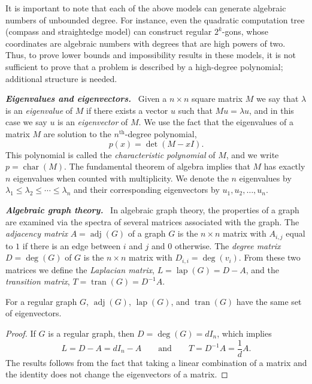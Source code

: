 \documentclass[oribibl,10pt]{llncs}
\newcommand{\Emph}[1]{\smallskip\textbf{\textit{#1}}~}
\DeclareMathOperator{\adjacency}{adj}
\DeclareMathOperator{\degree}{deg}
\DeclareMathOperator{\laplacian}{lap}
\DeclareMathOperator{\transition}{tran}
\DeclareMathOperator{\characteristic}{char}
\newcommand{\nth}[1]{$#1^\text{th}$}
\begin{document}
It is important to note that each of
the above models can generate algebraic numbers of unbounded degree. 
For instance, even the quadratic computation tree 
(compass and straightedge model) can construct regular $2^k$-gons, whose coordinates are
algebraic numbers with degrees that are high powers of two.
Thus, to prove lower bounds and impossibility results in these models, 
it is not sufficient to prove that a problem is described by a high-degree polynomial; additional structure is needed.

\ifFull
\Emph{Eigenvalues and eigenvectors.}
Given a $n\times n$ square matrix $M$ we say that $\lambda$ is an \emph{eigenvalue} of $M$ if there exists a vector $u$ such that $Mu = \lambda u$, and in this case we say $u$ is an \emph{eigenvector} of $M$. We use the fact that the eigenvalues of a matrix $M$ are solution to the \nth{n}-degree polynomial,
\[
p(x) = \det(M - xI).
\]
This polynomial is called the \emph{characteristic polynomial} of $M$,
and we write $p = \characteristic(M)$. The fundamental theorem of algebra implies that $M$ has exactly $n$ eigenvalues when counted with multiplicity. We denote the $n$ eigenvalues by $\lambda_1 \leq \lambda_2 \leq \cdots \leq \lambda_n$ and their corresponding eigenvectors by $u_1, u_2, \ldots, u_n$.
\fi

\Emph{Algebraic graph theory.}
In algebraic graph theory, the properties of a graph are examined via the spectra of several matrices associated with the graph. The \emph{adjacency matrix} $A = \adjacency(G)$ of a graph $G$ is the $n\times n$ matrix with $A_{i,j}$ equal to $1$ if there is an edge between $i$ and $j$ and $0$ otherwise. The \emph{degree matrix} $D = \degree(G)$ of $G$ is the $n\times n$ matrix with $D_{i,i} = \deg(v_i)$. From these two matrices we define the \emph{Laplacian matrix}, $L = \laplacian(G) = D - A$, 
and the \emph{transition matrix}, $T = \transition(G) = D^{-1}A$.

\begin{lemma}\label{lem:regular-eigenvalues}
For a regular graph $G$,  $ \adjacency(G)$, $ \laplacian(G)$, and $ \transition(G)$ have the same set of eigenvectors.
\end{lemma}
\ifFull
\begin{proof}
If $G$ is a regular graph, then $D = \degree(G) = dI_n$, which implies
\[
L = D - A = dI_n - A \qquad\text{and}\qquad T = D^{-1}A = \frac{1}{d} A.
\]
The results follows from the fact that taking a linear combination of a matrix and the identity does not change the eigenvectors of a matrix.
\end{proof}
\fi
\end{document}
